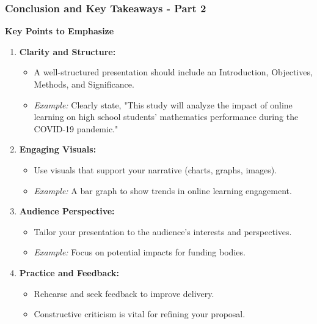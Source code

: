 \documentclass[aspectratio=169]{beamer}
\begin{document}
\begin{frame}[fragile]
    \frametitle{Conclusion and Key Takeaways - Part 2}
    \textbf{Key Points to Emphasize}
    
    \begin{enumerate}
        \item \textbf{Clarity and Structure:}
            \begin{itemize}
                \item A well-structured presentation should include an Introduction, Objectives, Methods, and Significance.
                \item \textit{Example:} Clearly state, "This study will analyze the impact of online learning on high school students' mathematics performance during the COVID-19 pandemic."
            \end{itemize}
        
        \item \textbf{Engaging Visuals:}
            \begin{itemize}
                \item Use visuals that support your narrative (charts, graphs, images).
                \item \textit{Example:} A bar graph to show trends in online learning engagement.
            \end{itemize}
        
        \item \textbf{Audience Perspective:}
            \begin{itemize}
                \item Tailor your presentation to the audience's interests and perspectives.
                \item \textit{Example:} Focus on potential impacts for funding bodies.
            \end{itemize}
            
        \item \textbf{Practice and Feedback:}
            \begin{itemize}
                \item Rehearse and seek feedback to improve delivery.
                \item Constructive criticism is vital for refining your proposal.
            \end{itemize}
    \end{enumerate}
\end{frame}
\end{document}
